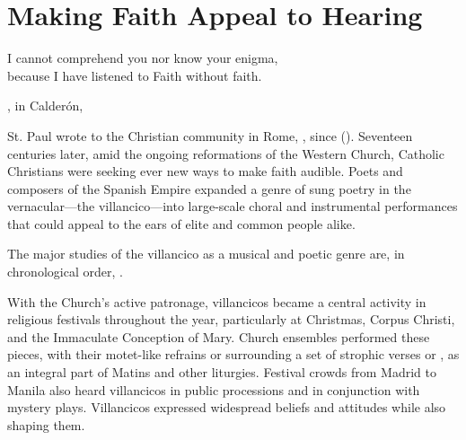 %
%
%

\chapter{Making Faith Appeal to Hearing}

\label{ch:faith-hearing}

\epigraph
{I cannot comprehend you nor know your enigma,\\
because I have listened to Faith without faith.}
{, in Calderón, }

St. Paul wrote to the Christian community in Rome, , since  ().
Seventeen centuries later, amid the ongoing reformations of the Western Church, 
Catholic Christians were seeking ever new ways to make faith audible.
Poets and composers of the Spanish Empire expanded a genre of sung poetry in 
the vernacular---the villancico---into large-scale choral and instrumental 
performances that could appeal to the ears of elite and common people alike.%
\begin{Footnote}
    The major studies of the villancico as a musical and poetic genre are, in 
    chronological order, 
    \autocites{Rubio:Forma}{Laird:VC}{Torrente:PhD}{Tenorio:SorJuana}
    {CaberoPueyo:PhD}{Illari:Polychoral}{Knighton-Torrente:VCs}
    {Cashner:Cards}{Cashner:PhD}.
\end{Footnote}

With the Church's active patronage, villancicos became a central activity in 
religious festivals throughout the year, particularly at Christmas, Corpus 
Christi, and the Immaculate Conception of Mary.
Church ensembles performed these pieces, with their motet-like refrains or 
 surrounding a set of strophic verses or , as an 
integral part of Matins and other liturgies.
Festival crowds from Madrid to Manila also heard villancicos in public 
processions and in conjunction with mystery plays.
Villancicos expressed widespread beliefs and attitudes while also shaping them.

